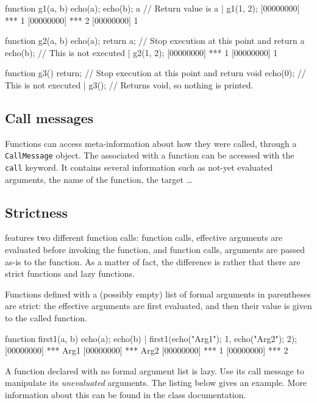 \begin{urbiscript}
function g1(a, b)
{
  echo(a);
  echo(b);
  a // Return value is a
}|
g1(1, 2);
[00000000] *** 1
[00000000] *** 2
[00000000] 1

function g2(a, b)
{
  echo(a);
  return a; // Stop execution at this point and return a
  echo(b); // This is not executed
}|
g2(1, 2);
[00000000] *** 1
[00000000] 1

function g3()
{
  return; // Stop execution at this point and return void
  echo(0); // This is not executed
}|
g3(); // Returns void, so nothing is printed.
\end{urbiscript}

\subsection{Call messages}
\label{sec:us-fun-callmsg}

Functions can access meta-information about how they were called,
through a \lstinline|CallMessage| object. The 
associated with a function can be accessed with the \lstinline|call|
keyword. It contains several information such as not-yet evaluated
arguments, the name of the function, the target \ldots

\subsection{Strictness}

\us features two different function calls:
 function calls, effective arguments are
evaluated before invoking the function, and 
function calls, arguments are passed as-is to the function.  As a
matter of fact, the difference is rather that there are strict
functions and lazy functions.

Functions defined with a (possibly empty) list of formal arguments in
parentheses are strict: the effective arguments are first evaluated,
and then their value is given to the called function.

\begin{urbiscript}
function first1(a, b) {
  echo(a); echo(b)
}|
first1({echo("Arg1"); 1},
       {echo("Arg2"); 2});
[00000000] *** Arg1
[00000000] *** Arg2
[00000000] *** 1
[00000000] *** 2
\end{urbiscript}

A function declared with no formal argument list is lazy.  Use its
call message to manipulate its \emph{unevaluated} arguments.
The listing below gives an example.  More information about
this can be found in the  class documentation.

